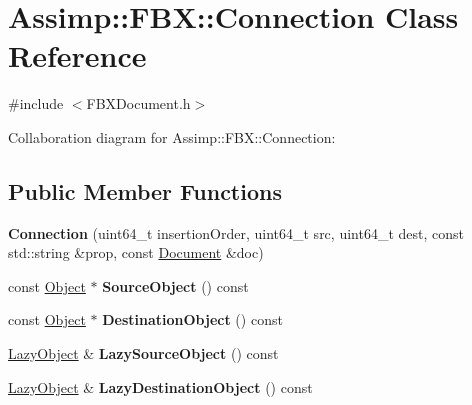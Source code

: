 \hypertarget{class_assimp_1_1_f_b_x_1_1_connection}{\section{Assimp\+:\+:F\+B\+X\+:\+:Connection Class Reference}
\label{class_assimp_1_1_f_b_x_1_1_connection}
}


{\ttfamily \#include $<$F\+B\+X\+Document.\+h$>$}



Collaboration diagram for Assimp\+:\+:F\+B\+X\+:\+:Connection\+:
\subsection*{Public Member Functions}
\begin{DoxyCompactItemize}
\item 
\hypertarget{class_assimp_1_1_f_b_x_1_1_connection_ae900758a5b157a9f33341e20a0a0459b}{{\bfseries Connection} (uint64\+\_\+t insertion\+Order, uint64\+\_\+t src, uint64\+\_\+t dest, const std\+::string \&prop, const \hyperlink{class_assimp_1_1_f_b_x_1_1_document}{Document} \&doc)}\label{class_assimp_1_1_f_b_x_1_1_connection_ae900758a5b157a9f33341e20a0a0459b}

\item 
\hypertarget{class_assimp_1_1_f_b_x_1_1_connection_a7ef9277b2da29b1f3569c46fb471cbd5}{const \hyperlink{class_assimp_1_1_f_b_x_1_1_object}{Object} $\ast$ {\bfseries Source\+Object} () const }\label{class_assimp_1_1_f_b_x_1_1_connection_a7ef9277b2da29b1f3569c46fb471cbd5}

\item 
\hypertarget{class_assimp_1_1_f_b_x_1_1_connection_a56303128d97dd140fa5c33dde5e68579}{const \hyperlink{class_assimp_1_1_f_b_x_1_1_object}{Object} $\ast$ {\bfseries Destination\+Object} () const }\label{class_assimp_1_1_f_b_x_1_1_connection_a56303128d97dd140fa5c33dde5e68579}

\item 
\hypertarget{class_assimp_1_1_f_b_x_1_1_connection_a194645b92a534c3940c3ccb40d49a41d}{\hyperlink{class_assimp_1_1_f_b_x_1_1_lazy_object}{Lazy\+Object} \& {\bfseries Lazy\+Source\+Object} () const }\label{class_assimp_1_1_f_b_x_1_1_connection_a194645b92a534c3940c3ccb40d49a41d}

\item 
\hypertarget{class_assimp_1_1_f_b_x_1_1_connection_af542636c30f11f6432eeb048e321e41f}{\hyperlink{class_assimp_1_1_f_b_x_1_1_lazy_object}{Lazy\+Object} \& {\bfseries Lazy\+Destination\+Object} () const }\label{class_assimp_1_1_f_b_x_1_1_connection_af542636c30f11f6432eeb048e321e41f}


\end{DoxyCompactItemize}
